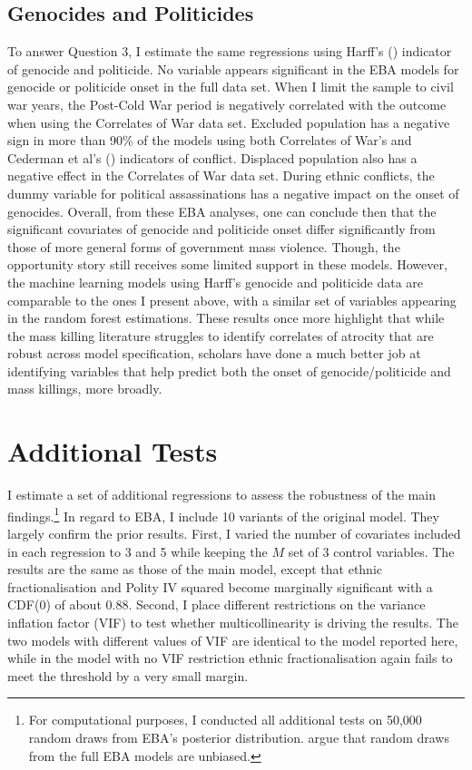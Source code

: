\subsection{Genocides and Politicides}%
\label{sub:genocides_and_politicides}

To answer Question 3, I estimate the same regressions using Harff's (\citeyear{harff2003no}) indicator of genocide and politicide. No variable appears significant in the EBA models for genocide or politicide onset in the full data set. When I limit the sample to civil war years, the Post-Cold War period is negatively correlated with the outcome when using the Correlates of War data set. Excluded population has a negative sign in more than 90\% of the models using both Correlates of War's and Cederman et al's (\citeyear{cederman2010ethnic}) indicators of conflict. Displaced population also has a negative effect in the Correlates of War data set. During ethnic conflicts, the dummy variable for political assassinations has a negative impact on the onset of genocides. Overall, from these EBA analyses, one can conclude then that the significant covariates of genocide and politicide onset differ significantly from those of more general forms of government mass violence. Though, the opportunity story still receives some limited support in these models. However, the machine learning models using Harff's genocide and politicide data are comparable to the ones I present above, with a similar set of variables appearing in the random forest estimations. These results once more highlight that while the mass killing literature struggles to identify correlates of atrocity that are robust across model specification, scholars have done a much better job at identifying variables that help predict both the onset of genocide/politicide and mass killings, more broadly.

\section{Additional Tests}
\label{sec:additional-tests4}

I estimate a set of additional regressions to assess the robustness of the main findings.\footnote{For computational purposes, I conducted all additional tests on 50,000 random draws from EBA's posterior distribution. \citet[819]{salaimartin2004determinants} argue that random draws from the full EBA models are unbiased.} In regard to EBA, I include 10 variants of the original model. They largely confirm the prior results. First, I varied the number of covariates included in each regression to 3 and 5 while keeping the $M$ set of 3 control variables. The results are the same as those of the main model, except that ethnic fractionalisation and Polity IV squared become marginally significant with a CDF(0) of about 0.88. Second, I place different restrictions on the variance inflation factor (VIF) to test whether multicollinearity is driving the results. The two models with different values of VIF are identical to the model reported here, while in the model with no VIF restriction ethnic fractionalisation again fails to meet the threshold by a very small margin. 
	
